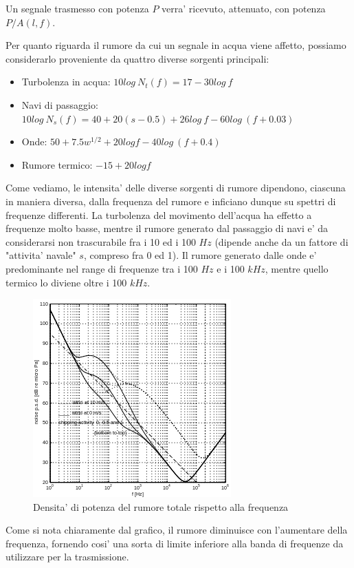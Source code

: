Un segnale trasmesso con potenza $P$ verra' ricevuto, attenuato, con potenza $P/A(l, f)$.
\par
Per quanto riguarda il rumore da cui un segnale in acqua viene affetto, possiamo considerarlo proveniente da quattro diverse sorgenti principali:
\begin{itemize}
    \item Turbolenza in acqua: $10log\ N_t(f) = 17 - 30log\ f$
    \item Navi di passaggio: $10log\ N_s(f) = 40 + 20(s - 0.5) + 26log\ f - 60log\ (f+0.03)$
    \item Onde: $50 + 7.5w^{1/2}+ 20logf - 40log\ (f+0.4)$
    \item Rumore termico: $-15 + 20logf$
\end{itemize}
Come vediamo, le intensita' delle diverse sorgenti di rumore dipendono, ciascuna in maniera diversa, dalla frequenza del rumore e inficiano dunque su spettri di frequenze differenti. La turbolenza del movimento dell'acqua ha effetto a frequenze molto basse, mentre il rumore generato dal passaggio di navi e' da considerarsi non trascurabile fra i 10 ed i 100 $Hz$ (dipende anche da un fattore di "attivita' navale" $s$, compreso fra 0 ed 1). Il rumore generato dalle onde e' predominante nel range di frequenze tra i 100 $Hz$ e i 100 $kHz$, mentre quello termico lo diviene oltre i 100 $kHz$.
\begin{figure}[H]
    \centering
    \includegraphics[]{noise.png}
    \caption{Densita' di potenza del rumore totale rispetto alla frequenza}
\end{figure}
Come si nota chiaramente dal grafico, il rumore diminuisce con l'aumentare della frequenza, fornendo cosi' una sorta di limite inferiore alla banda di frequenze da utilizzare per la trasmissione.
\par

